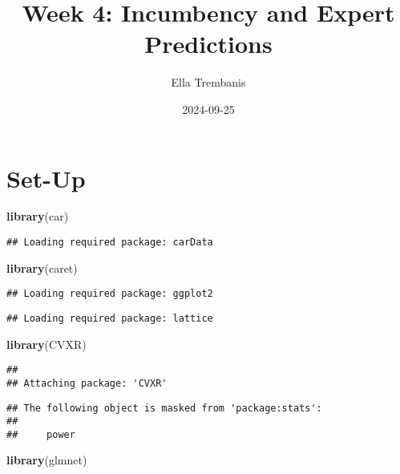 \documentclass[
]{article}
\title{Week 4: Incumbency and Expert Predictions}
\author{Ella Trembanis}
\date{2024-09-25}
\newenvironment{Shaded}{\begin{snugshade}}{\end{snugshade}}
\newcommand{\FunctionTok}[1]{\textcolor[rgb]{0.13,0.29,0.53}{\textbf{#1}}}
\newcommand{\NormalTok}[1]{#1}
\begin{document}
\maketitle

\section{Set-Up}\label{set-up}

\begin{Shaded}
\begin{Highlighting}[]
\FunctionTok{library}\NormalTok{(car)}
\end{Highlighting}
\end{Shaded}

\begin{verbatim}
## Loading required package: carData
\end{verbatim}

\begin{Shaded}
\begin{Highlighting}[]
\FunctionTok{library}\NormalTok{(caret)}
\end{Highlighting}
\end{Shaded}

\begin{verbatim}
## Loading required package: ggplot2
\end{verbatim}

\begin{verbatim}
## Loading required package: lattice
\end{verbatim}

\begin{Shaded}
\begin{Highlighting}[]
\FunctionTok{library}\NormalTok{(CVXR)}
\end{Highlighting}
\end{Shaded}

\begin{verbatim}
## 
## Attaching package: 'CVXR'
\end{verbatim}

\begin{verbatim}
## The following object is masked from 'package:stats':
## 
##     power
\end{verbatim}

\begin{Shaded}
\begin{Highlighting}[]
\FunctionTok{library}\NormalTok{(glmnet)}
\end{Highlighting}
\end{Shaded}
\end{document}
